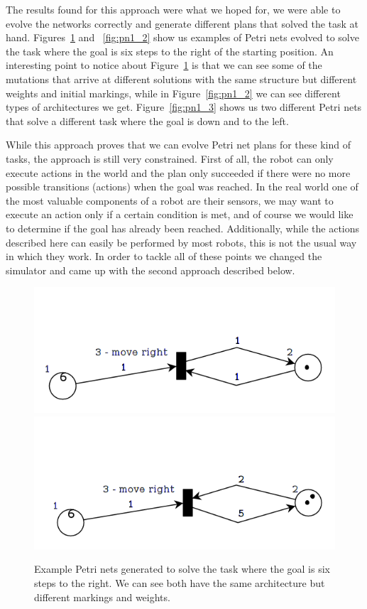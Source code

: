\documentclass[12pt,a4paper,twocolumn]{article}
\begin{document}
The results found for this approach were what we hoped for, we were able to evolve the networks correctly and generate different plans that solved the task at hand. Figures~\ref{fig:pn1_1} and ~\ref{fig:pn1_2} show us examples of Petri nets evolved to solve the task where the goal is six steps to the right of the starting position. An interesting point to notice about Figure~\ref{fig:pn1_1} is that we can see some of the mutations that arrive at different solutions with the same structure but different weights and initial markings, while in Figure~\ref{fig:pn1_2} we can see different types of architectures we get. Figure~\ref{fig:pn1_3} shows us two different Petri nets that solve a different task where the goal is down and to the left. 

While this approach proves that we can evolve Petri net plans for these kind of tasks, the approach is still very constrained. First of all, the robot can only execute actions in the world and the plan only succeeded if there were no more possible transitions (actions) when the goal was reached. In the real world one of the most valuable components of a robot are their sensors, we may want to execute an action only if a certain condition is met, and of course we would like to determine if the goal has already been reached. Additionally, while the actions described here can easily be performed by most robots, this is not the usual way in which they work. In order to tackle all of these points we changed the simulator and came up with the second approach described below. 



\begin{figure} [h]
\centering
\includegraphics[scale=0.3, trim = 0 5mm 0 30mm, clip = true]{PetriNet_1_1}
\includegraphics[scale=0.3, trim = 0 5mm 0 35mm, clip = true]{PetriNet_1_2}
\caption{Example Petri nets generated to solve the task where the goal is six steps to the right. We can see both have the same architecture but different markings and weights.}
\label{fig:pn1_1}
\end{figure}
\end{document}
